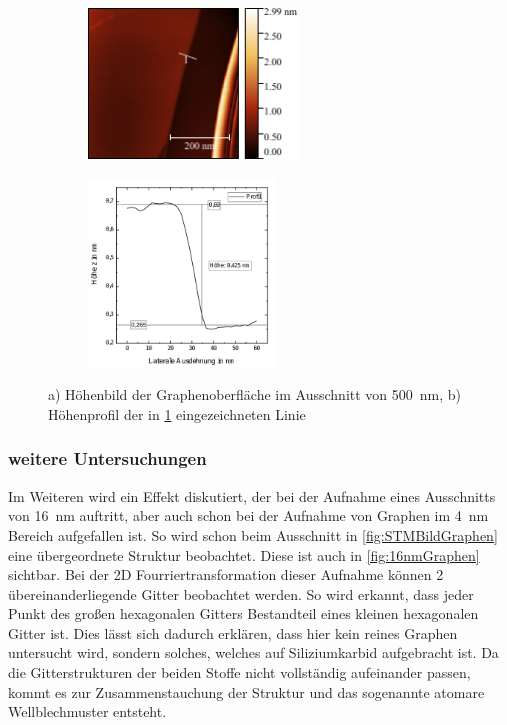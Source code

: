 \documentclass[a4paper,twoside,final]{article}
\begin{document}
\begin{figure}[h]
    \centering
    \begin{subfigure}{0.45\textwidth}
        \includegraphics[height=4cm]{Bilder/Image02125_Kantenmessung_Graphen_richtig_mitLinie.pdf}
        \caption{ }
        \label{fig:Kante}
    \end{subfigure}
    \hspace{0.5cm}
    \begin{subfigure}{0.45\textwidth}
        \includegraphics[height=5cm]{Bilder/Graphen_Kante.pdf}
        \caption{ }
        \label{fig:KanteHöhe}
    \end{subfigure}
    \caption{ a) Höhenbild der Graphenoberfläche im Ausschnitt von \SI{500}{\nano\meter}, b) Höhenprofil der in \ref{fig:Kante} eingezeichneten Linie}
\end{figure}


\subsubsection{weitere Untersuchungen}
Im Weiteren wird ein Effekt diskutiert, der bei der Aufnahme eines Ausschnitts von \SI{16}{\nano\meter} auftritt, aber auch schon bei der Aufnahme von Graphen im \SI{4}{\nano\meter} Bereich aufgefallen ist. So wird schon beim Ausschnitt in \ref{fig:STMBildGraphen} eine übergeordnete Struktur beobachtet. Diese ist auch in \ref{fig:16nmGraphen} sichtbar. Bei der 2D Fourriertransformation dieser Aufnahme können 2 übereinanderliegende Gitter beobachtet werden. So wird erkannt, dass jeder Punkt des großen hexagonalen Gitters Bestandteil eines kleinen hexagonalen Gitter ist. Dies lässt sich dadurch erklären, dass hier kein reines Graphen untersucht wird, sondern solches, welches auf Siliziumkarbid aufgebracht ist. Da die Gitterstrukturen der beiden Stoffe nicht vollständig aufeinander passen, kommt es zur Zusammenstauchung der Struktur und das sogenannte atomare Wellblechmuster entsteht. \\
\end{document}
